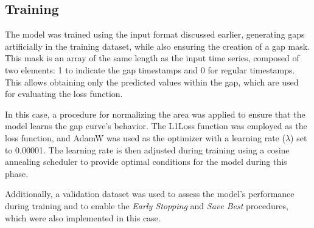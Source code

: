 \subsection{Training}
The model was trained using the input format discussed earlier,
generating gaps artificially in the training dataset, while also ensuring the
creation of a gap mask.
This mask is an array of the same length as the input time series,
composed of two elements: 1 to indicate the gap timestamps and 0 for regular timestamps.
This allows obtaining only the predicted values within the gap,
which are used for evaluating the loss function.

In this case, a procedure for normalizing the area was applied to ensure that the
model learns the gap curve's behavior.
The L1Loss\cite{loss} function was employed as the loss function, and AdamW\cite{adamw} was used as the
optimizer with a learning rate ($\lambda$) set to 0.00001.
The learning rate is then adjusted during training using a cosine annealing scheduler\cite{scheduler1}\cite{scheduler2}
to provide optimal conditions for the model during this phase.

Additionally, a validation dataset was used to assess the model's
performance during training and to enable the
\textit{Early Stopping}\cite{es} and \textit{Save Best} procedures,
which were also implemented in this case.


